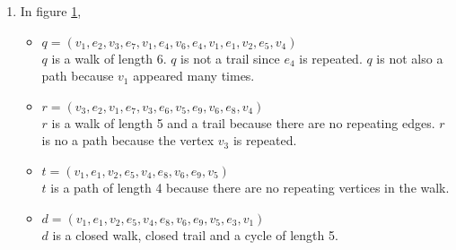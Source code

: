\begin{enumerate}
\begin{figure}[h!]
\label{walkfig}
\end{figure}
\item[] In figure \ref{walkfig},
\begin{itemize}
\item $q=(v_1,e_2,v_3,e_7,v_1,e_4,v_6,e_4,v_1,e_1,v_2,e_5,v_4)$\\ $q$ is a walk of length 6. $q$ is not a trail since $e_4$ is repeated. $q$ is not also a path because $v_1$ appeared many times.
\item $r=(v_3,e_2,v_1,e_7,v_3,e_6,v_5,e_9,v_6,e_8,v_4)$ \\ $r$ is a walk of length 5 and a trail because there are no repeating edges. $r$ is no a path because the vertex $v_3$ is repeated.
\item $t=(v_1,e_1,v_2,e_5,v_4,e_8,v_6,e_9,v_5)$ \\ $t$ is a path of length 4 because there are no repeating vertices in the walk.
\item $d=(v_1,e_1,v_2,e_5,v_4,e_8,v_6,e_9,v_5,e_3,v_1)$ \\ $d$ is a closed walk, closed trail and a cycle of length 5.
\end{itemize}

\end{enumerate}



